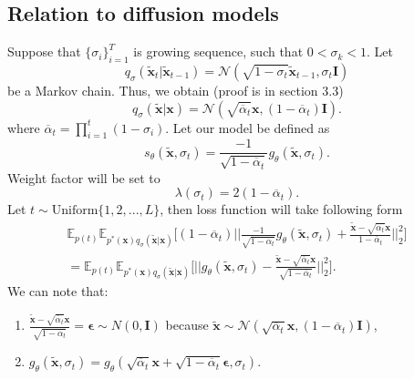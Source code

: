 \documentclass[10pt]{article}
\begin{document}
\subsection{Relation to diffusion models}

Suppose that $\{ \sigma_i \}_{i=1}^T$ is growing sequence, such that $0 < \sigma_k< 1$. Let
\begin{equation}
q_{\sigma}( \tilde{\textbf{x}}_t | \tilde{\textbf{x}}_{t-1}) =
\mathcal{N}( \sqrt{1 - \sigma_t}  \tilde{\textbf{x}}_{t-1}, \sigma_t \mathbf{I} )
\end{equation}
be a Markov chain.
Thus, we obtain (proof is in section 3.3)
\begin{equation}
q_{\sigma}( \tilde{\textbf{x}} | \textbf{x} ) =
\mathcal{N}( \sqrt{\overline{\alpha}_{t}} \textbf{x} , (1 - \overline{\alpha}_{t}) \mathbf{I} ).
\end{equation}
where $ \overline{\alpha}_{t} = \prod_{i=1}^t (1 - \sigma_i)$.
Let our model be defined as 
\begin{equation}
s_{\theta}( \tilde{\textbf{x}}, \sigma_t ) = \frac{-1}{ \sqrt{1 - \overline{\alpha}_{t}} } g_{\theta}(\tilde{\textbf{x}}, \sigma_t ).
\end{equation}
Weight factor will be set to 
\begin{equation}
    \lambda(\sigma_t) = 2( 1 - \overline{\alpha}_{t}).
\end{equation}
Let $t \sim \text{Uniform} \{1, 2, ..., L \}$, then loss function will take following form
\begin{gather}
    \mathbb{E}_{p(t)}
    \mathbb{E}_{p^*(\textbf{x})q_{\sigma}( \tilde{\textbf{x}} | \textbf{x} )  }
    \Big[  (1 - \overline{\alpha}_{t}) || \frac{-1}{ \sqrt{1 - \overline{\alpha}_{t}} } g_{\theta}(\tilde{\textbf{x}}, \sigma_t )  +
   \frac{\tilde{\textbf{x}} -\sqrt{\overline{\alpha}_{t}} \textbf{x} }
   { 1 - \overline{\alpha}_{t}} ||_2^2 \Big] \\
   = \mathbb{E}_{p(t)}
    \mathbb{E}_{p^*(\textbf{x})q_{\sigma}( \tilde{\textbf{x}} | \textbf{x} )  }
    \Big[ || g_{\theta}(\tilde{\textbf{x}}, \sigma_t )  -
   \frac{\tilde{\textbf{x}} -\sqrt{\overline{\alpha}_{t}} \textbf{x} }
   { \sqrt{1 - \overline{\alpha}_{t}} } ||_2^2 \Big].
\end{gather}
We can note that:
\begin{enumerate}
    \item   $\frac{\tilde{\textbf{x}} -\sqrt{\overline{\alpha}_{t}} \textbf{x} }
   { \sqrt{1 - \overline{\alpha}_{t}} } = \bm{\epsilon} \sim N(0, \mathbf{I})$
   because $\tilde{\textbf{x}} \sim  \mathcal{N}( \sqrt{\overline{\alpha}_{t}} \textbf{x} , (1 - \overline{\alpha}_{t}) \mathbf{I} ) $,
   \item $ g_{\theta}(\tilde{\textbf{x}}, \sigma_t ) =
   g_{\theta}(\sqrt{\overline{\alpha}_{t}} \textbf{x} +  \sqrt{1 - \overline{\alpha}_{t}} \bm{\epsilon}, \sigma_t ) $.
\end{enumerate}
\end{document}
